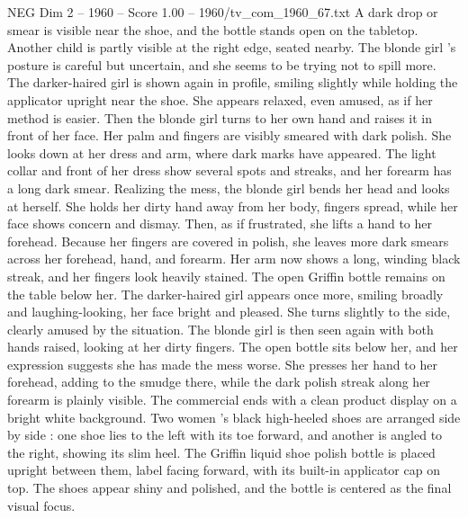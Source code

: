 \begin{textsample}{NEG Dim 2 – 1960 – Score 1.00 – 1960/tv\_com\_1960\_67.txt}
A dark drop or smear is visible near the shoe, and the bottle stands open on the tabletop.
Another child is partly visible at the right edge, seated nearby.
The blonde girl ’s posture is careful but uncertain, and she seems to be trying not to spill more.
The darker-haired girl is shown again in profile, smiling slightly while holding the applicator upright near the shoe.
She appears relaxed, even amused, as if her method is easier.
Then the blonde girl turns to her own hand and raises it in front of her face.
Her palm and fingers are visibly smeared with dark polish.
She looks down at her dress and arm, where dark marks have appeared.
The light collar and front of her dress show several spots and streaks, and her forearm has a long dark smear.
Realizing the mess, the blonde girl bends her head and looks at herself.
She holds her dirty hand away from her body, fingers spread, while her face shows concern and dismay.
Then, as if frustrated, she lifts a hand to her forehead.
Because her fingers are covered in polish, she leaves more dark smears across her forehead, hand, and forearm.
Her arm now shows a long, winding black streak, and her fingers look heavily stained.
The open Griffin bottle remains on the table below her.
The darker-haired girl appears once more, smiling broadly and laughing-looking, her face bright and pleased.
She turns slightly to the side, clearly amused by the situation.
The blonde girl is then seen again with both hands raised, looking at her dirty fingers.
The open bottle sits below her, and her expression suggests she has made the mess worse.
She presses her hand to her forehead, adding to the smudge there, while the dark polish streak along her forearm is plainly visible.
The commercial ends with a clean product display on a bright white background.
Two women ’s black high-heeled shoes are arranged side by side : one shoe lies to the left with its toe forward, and another is angled to the right, showing its slim heel.
The Griffin liquid shoe polish bottle is placed upright between them, label facing forward, with its built-in applicator cap on top.
The shoes appear shiny and polished, and the bottle is centered as the final visual focus.

\end{textsample}
